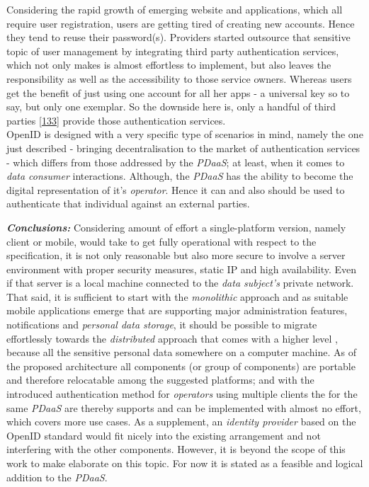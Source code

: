 \documentclass[12pt,english,a4paper,titlepage,cleardoublepage=empty,dottedtoc]{report}
\begin{document}
Considering the rapid growth of emerging website and applications, which
all require user registration, users are getting tired of creating new
accounts. Hence they tend to reuse their password(s). Providers started
outsource that sensitive topic of user management by integrating third
party authentication services, which not only makes is almost effortless
to implement, but also leaves the responsibility as well as the
accessibility to those service owners. Whereas users get the benefit of
just using one account for all her apps - a universal key so to say, but
only one exemplar. So the downside here is, only a handful of third
parties
{[}\protect\hyperlink{ref-web_2009-success-of-facebook-connect}{133}{]}
provide those authentication services.\\
OpenID is designed with a very specific type of scenarios in mind,
namely the one just described - bringing decentralisation to the market
of authentication services - which differs from those addressed by the
\emph{PDaaS}; at least, when it comes to \emph{data consumer}
interactions. Although, the \emph{PDaaS} has the ability to become the
digital representation of it's \emph{operator}. Hence it can and also
should be used to authenticate that individual against an external
parties.

\emph{\textbf{Conclusions:}} Considering amount of effort a
single-platform version, namely client or mobile, would take to get
fully operational with respect to the specification, it is not only
reasonable but also more secure to involve a server environment with
proper security measures, static IP and high availability. Even if that
server is a local machine connected to the \emph{data subject's} private
network. That said, it is sufficient to start with the \emph{monolithic}
approach and as suitable mobile applications emerge that are supporting
major administration features, notifications and \emph{personal data
storage}, it should be possible to migrate effortlessly towards the
\emph{distributed} approach that comes with a higher level , because all
the sensitive personal data somewhere on a computer machine. As of the
proposed architecture all components (or group of components) are
portable and therefore relocatable among the suggested platforms; and
with the introduced authentication method for \emph{operators} using
multiple clients the for the same \emph{PDaaS} are thereby supports and
can be implemented with almost no effort, which covers more use cases.
As a supplement, an \emph{identity provider} based on the OpenID
standard would fit nicely into the existing arrangement and not
interfering with the other components. However, it is beyond the scope
of this work to make elaborate on this topic. For now it is stated as a
feasible and logical addition to the \emph{PDaaS}.
\end{document}

